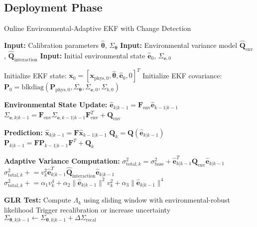 \documentclass[11pt]{article}
\begin{document}
\subsection{Deployment Phase}

\begin{algorithm}
\caption{Online Environmental-Adaptive EKF with Change Detection}
\begin{algorithmic}[1]
\State \textbf{Input:} Calibration parameters $\hat{\bm{\theta}}$, $\Sigma_{\bm{\theta}}$
\State \textbf{Input:} Environmental variance model $\hat{\mathbf{Q}}_{\text{env}}$, $\hat{\mathbf{Q}}_{\text{interaction}}$
\State \textbf{Input:} Initial environmental state $\hat{\mathbf{e}}_0$, $\Sigma_{\mathbf{e},0}$

\State Initialize EKF state: $\mathbf{x}_0 = [\mathbf{x}_{\text{phys},0}, \hat{\bm{\theta}}, \hat{\mathbf{e}}_0, 0]^T$
\State Initialize EKF covariance: $\mathbf{P}_0 = \text{blkdiag}(\mathbf{P}_{\text{phys},0}, \Sigma_{\bm{\theta}}, \Sigma_{\mathbf{e},0}, \Sigma_{b,0})$

    \State \textbf{Environmental State Update:}
    \State $\hat{\mathbf{e}}_{k|k-1} = \mathbf{F}_{\text{env}} \hat{\mathbf{e}}_{k-1|k-1}$
    \State $\Sigma_{\mathbf{e},k|k-1} = \mathbf{F}_{\text{env}} \Sigma_{\mathbf{e},k-1|k-1} \mathbf{F}_{\text{env}}^T + \mathbf{Q}_{\text{env}}$
    
    \State \textbf{Prediction:}
    \State $\hat{\mathbf{x}}_{k|k-1} = \mathbf{F} \hat{\mathbf{x}}_{k-1|k-1}$
    \State $\mathbf{Q}_k = \mathbf{Q}(\hat{\mathbf{e}}_{k|k-1})$ 
    \State $\mathbf{P}_{k|k-1} = \mathbf{F} \mathbf{P}_{k-1|k-1} \mathbf{F}^T + \mathbf{Q}_k$
    
    \State \textbf{Adaptive Variance Computation:}
    \State $\sigma_{\text{total},k}^2 = \sigma_{\text{base}}^2 + \hat{\mathbf{e}}_{k|k-1}^T \hat{\mathbf{Q}}_{\text{env}} \hat{\mathbf{e}}_{k|k-1}$
    \State $\sigma_{\text{total},k}^2 \mathrel{+}= v_k^2 \hat{\mathbf{e}}_{k|k-1}^T \hat{\mathbf{Q}}_{\text{interaction}} \hat{\mathbf{e}}_{k|k-1}$
    \State $\sigma_{\text{total},k}^2 \mathrel{+}= \alpha_1 v_k^4 + \alpha_2 \|\hat{\mathbf{e}}_{k|k-1}\|^2 v_k^2 + \alpha_3 \|\hat{\mathbf{e}}_{k|k-1}\|^4$
    
    \State \textbf{GLR Test:}
    \State Compute $\Lambda_k$ using sliding window with environmental-robust likelihood
        \State Trigger recalibration or increase uncertainty
        \State $\Sigma_{\bm{\theta},k|k-1} \leftarrow \Sigma_{\bm{\theta},k|k-1} + \Delta \Sigma_{\text{recal}}$
    \EndIf
    

\end{algorithmic}
\end{algorithm}
\end{document}
